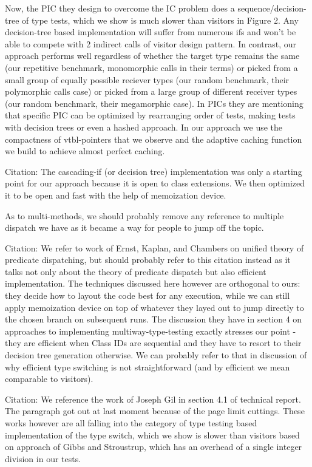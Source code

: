 Now, the PIC they design to overcome the IC problem does a 
sequence/decision-tree of type tests, which we show is much slower than visitors 
in Figure 2. Any decision-tree based implementation will suffer from numerous 
ifs and won't be able to compete with 2 indirect calls of visitor design 
pattern.  In contrast, our approach performs well regardless of whether the 
target type remains the same (our repetitive benchmark, monomorphic calls in 
their terms) or picked from a small group of equally possible reciever types 
(our random benchmark, their polymorphic calls case) or picked from a large 
group of different receiver types (our random benchmark, their megamorphic 
case). In PICs they are mentioning that specific PIC can be optimized by 
rearranging order of tests, making tests with decision trees or even a hashed 
approach. In our approach we use the compactness of vtbl-pointers that we 
observe and the adaptive caching function we build to achieve almost perfect 
caching.

Citation\cite{Clifton:2000:MMO:353171.353181}:
The cascading-if (or decision tree) implementation was only a starting point for 
our approach because it is open to class extensions. We then optimized it to be 
open and fast with the help of memoization device.  

As to multi-methods, we should probably remove any reference to multiple 
dispatch we have as it became a way for people to jump off the topic. 

Citation\cite{Chambers:1999:EMP:320384.320407}:
We refer to work of Ernst, Kaplan, and Chambers on unified theory of predicate 
dispatching, but should probably refer to this citation instead as it talks not 
only about the theory of predicate dispatch but also efficient implementation. 
The techniques discussed here however are orthogonal to ours: they decide how to 
layout the code best for any execution, while we can still apply memoization 
device on top of whatever they layed out to jump directly to the chosen branch 
on subsequent runs. The discussion they have in section 4 on approaches to 
implementing multiway-type-testing exactly stresses our point - they are 
efficient when Class IDs are sequential and they have to resort to their 
decision tree generation otherwise. We can probably refer to that in discussion 
of why efficient type switching is not straightforward (and by efficient we mean 
comparable to visitors).

Citation\cite{PQEncoding,Zibin:2002:FAC:582419.582434}:
We reference the work of Joseph Gil in section 4.1 of technical report. The 
paragraph got out at last moment because of the page limit cuttings. These works 
however are all falling into the category of type testing based implementation 
of the type switch, which we show is slower than visitors based on approach of 
Gibbs and Stroustrup, which has an overhead of a single integer division in our 
tests. 


